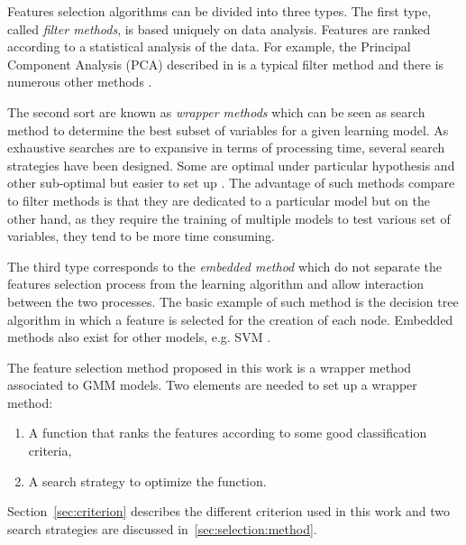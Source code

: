 \documentclass[journal,peerreview,onecolumn]{IEEEtran}
\begin{document}
Features selection algorithms can be divided into three types. The first type, called \emph{filter methods}, is based uniquely on data analysis. Features are ranked according to a statistical analysis of the data. For example, the Principal Component Analysis (PCA) described in \cite{jimenez1998supervised} is a typical filter method and there is numerous other methods \cite{bruzzone1995extension,biesiada2007feature,demir2008phase}.

The second sort are known as \emph{wrapper methods} which can be seen as search method to determine the best subset of variables for a given learning model. As exhaustive searches are to expansive in terms of processing time, several search strategies have been designed. Some are optimal under particular hypothesis \cite{narendra1977branch} and other sub-optimal but easier to set up \cite{whitney1971direct,somol1999adaptive}. The advantage of such methods compare to filter methods is that they are dedicated to a particular model but on the other hand, as they require the training of multiple models to test various set of variables, they tend to be more time consuming.

The third type corresponds to the \emph{embedded method} which do not separate the features selection process from the learning algorithm and allow interaction between the two processes. The basic example of such method is the decision tree algorithm in which a feature is selected for the creation of each node. Embedded methods also exist for other models, e.g. SVM \cite{guyon2002gene,weston2003use}.

The feature selection method proposed in this work is a wrapper method associated to GMM models. Two elements are needed to set up a wrapper method:
\begin{enumerate}
\item A function that  ranks the features according to some good classification criteria,
\item A search strategy to optimize the function.
\end{enumerate}

Section~\ref{sec:criterion} describes the different criterion used in this work and two search strategies are discussed in~\ref{sec:selection:method}.
\end{document}
